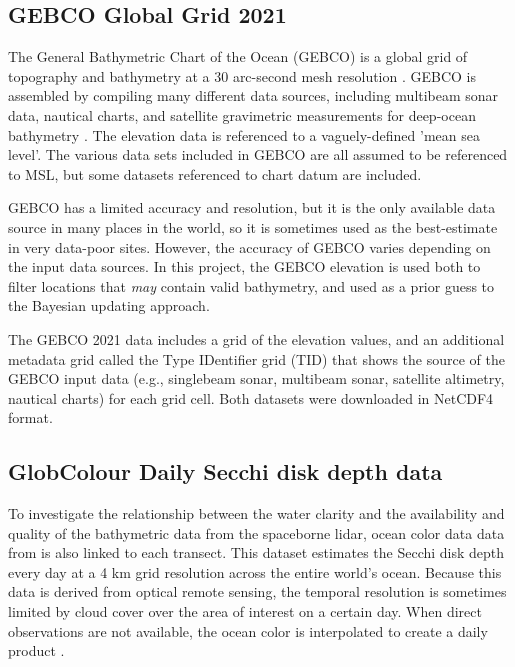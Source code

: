 \subsection{GEBCO Global Grid 2021}

The General Bathymetric Chart of the Ocean (GEBCO) is a global grid of topography and bathymetry at a 30 arc-second mesh resolution \parencite{gebco2021griddata}. GEBCO is assembled by compiling many different data sources, including multibeam sonar data, nautical charts, and satellite gravimetric measurements for deep-ocean bathymetry \parencite{gebcocookbook}. The elevation data is referenced to a vaguely-defined 'mean sea level'. The various data sets included in GEBCO are all assumed to be referenced to MSL, but some datasets referenced to chart datum are included. 

GEBCO has a limited accuracy and resolution, but it is the only available data source in many places in the world, so it is sometimes used as the best-estimate in very data-poor sites. However, the accuracy of GEBCO varies depending on the input data sources. In this project, the GEBCO elevation is used both to filter locations that \emph{may} contain valid bathymetry, and used as a prior guess to the Bayesian updating approach. 

The GEBCO 2021 data includes a grid of the elevation values, and an additional metadata grid called the Type IDentifier grid (TID) that shows the source of the GEBCO input data (e.g., singlebeam sonar, multibeam sonar, satellite altimetry, nautical charts) for each grid cell. Both datasets were downloaded in NetCDF4 format.


\subsection{GlobColour Daily Secchi disk depth data}

To investigate the relationship between the water clarity and the availability and quality of the bathymetric data from the spaceborne lidar, ocean color data data from \citeauthor{Garnesson2019} is also linked to each transect. This dataset estimates the Secchi disk depth every day at a 4 km grid resolution across the entire world's ocean. Because this data is derived from optical remote sensing, the temporal resolution is sometimes limited by cloud cover over the area of interest on a certain day. When direct observations are not available, the ocean color is interpolated to create a daily product \parencite{Garnesson2019}.

